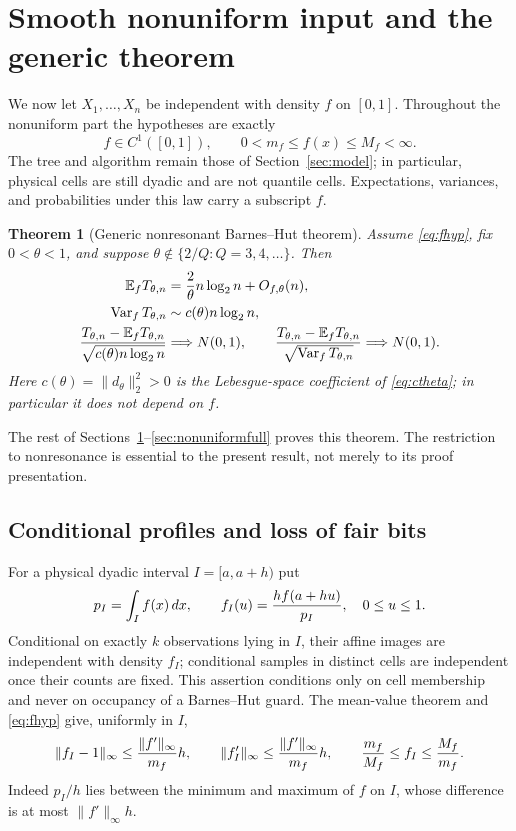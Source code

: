 \documentclass[11pt]{article}
\numberwithin{equation}{section}
\newtheorem{theorem}{Theorem}[section]
\theoremstyle{definition}\newtheorem{definition}[theorem]{Definition}
\theoremstyle{remark}\newtheorem{remark}[theorem]{Remark}
\newcommand{\E}{\mathbb E}\newcommand{\Pp}{\mathbb P}
\newcommand{\Var}{\operatorname {Var}}\newcommand{\Cov}{\operatorname {Cov}}
\newcommand{\1}{\mathbf 1}\newcommand{\cD}{\mathcal D}
\begin{document}
\clearpage
\section{Smooth nonuniform input and the generic theorem}\label{sec:nonuniform}
We now let $X_1,\ldots,X_n$ be independent with density $f$ on $[0,1]$.
Throughout the nonuniform part the hypotheses are exactly
\begin{equation}
 f\in C^1([0,1]),\qquad 0<m_f\le f(x)\le M_f<\infty.       \label{eq:fhyp}
\end{equation}
The tree and algorithm remain those of Section~\ref{sec:model}; in particular,
physical cells are still dyadic and are not quantile cells.  Expectations,
variances, and probabilities under this law carry a subscript $f$.

\begin{theorem}[Generic nonresonant Barnes--Hut theorem]\label{thm:generic}
Assume \eqref{eq:fhyp}, fix $0<\theta<1$, and suppose
$\theta\notin\{2/Q:Q=3,4,\ldots\}$.  Then
\begin{align}
 \E_fT_{\theta,n}&={2\over\theta}n\log_2n+O_{f,\theta}(n),
                                                        \label{eq:genericmean}\\
 \Var_fT_{\theta,n}&\sim c(\theta)n\log_2n,             \label{eq:genericvar}\\
 {T_{\theta,n}-\E_fT_{\theta,n}\over
       \sqrt{c(\theta)n\log_2n}}&\Longrightarrow N(0,1),\qquad
 {T_{\theta,n}-\E_fT_{\theta,n}\over
       \sqrt{\Var_fT_{\theta,n}}}\Longrightarrow N(0,1). \label{eq:genericclt}
\end{align}
Here $c(\theta)=\|d_\theta\|_2^2>0$ is the Lebesgue-space coefficient
of \eqref{eq:ctheta}; in particular it does not depend on $f$.
\end{theorem}
The rest of Sections~\ref{sec:nonuniform}--\ref{sec:nonuniformfull} proves
this theorem.  The restriction to nonresonance is essential to the present
result, not merely to its proof presentation.

\subsection{Conditional profiles and loss of fair bits}
For a physical dyadic interval $I=[a,a+h)$ put
\begin{equation}
 p_I=\int_I f(x)\,dx,\qquad f_I(u)={h f(a+hu)\over p_I},
 \quad 0\le u\le1.                                      \label{eq:profile}
\end{equation}
Conditional on exactly $k$ observations lying in $I$, their affine images
are independent with density $f_I$; conditional samples in distinct cells
are independent once their counts are fixed.  This assertion conditions
only on cell membership and never on occupancy of a Barnes--Hut guard.
The mean-value theorem and \eqref{eq:fhyp} give, uniformly in $I$,
\begin{equation}
 \|f_I-1\|_\infty\le {\|f'\|_\infty\over m_f}h,
 \qquad \|f_I'\|_\infty\le {\|f'\|_\infty\over m_f}h,
 \qquad {m_f\over M_f}\le f_I\le {M_f\over m_f}.       \label{eq:flat}
\end{equation}
Indeed $p_I/h$ lies between the minimum and maximum of $f$ on $I$, whose
difference is at most $\|f'\|_\infty h$.
\end{document}
